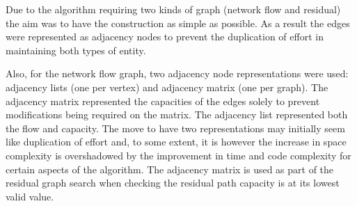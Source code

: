 Due to the algorithm requiring two kinds of graph (network flow and residual)
the aim was to have the construction as simple as possible. As a result the
edges were represented as adjacency nodes to prevent the duplication of effort
in maintaining both types of entity.

Also, for the network flow graph, two adjacency node representations were used:
adjacency lists (one per vertex) and adjacency matrix (one per graph). The
adjacency matrix represented the capacities of the edges solely to prevent
modifications being required on the matrix. The adjacency list represented both
the flow and capacity. The move to have two representations may initially seem
like duplication of effort and, to some extent, it is however the increase in
space complexity is overshadowed by the improvement in time and code complexity
for certain aspects of the algorithm. The adjacency matrix is used as part of
the residual graph search when checking the residual path capacity is at its
lowest valid value.
